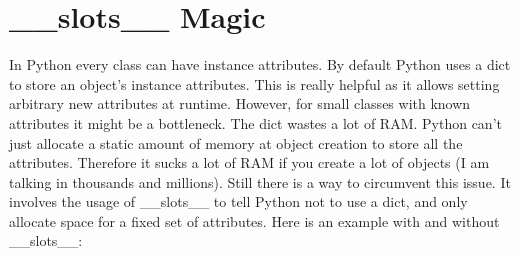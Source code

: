 \documentclass{report}
\begin{document}
    \pagebreak \bigbreak \noindent \section{\_\_slots\_\_ Magic}
    \bigbreak \noindent
    In Python every class can have instance attributes. By default Python uses a dict to store an object’s instance attributes. This is really helpful as it allows setting arbitrary new attributes at runtime.
    \bigbreak \noindent 
    However, for small classes with known attributes it might be a bottleneck. The dict wastes a lot of RAM. Python can’t just allocate a static amount of memory at object creation to store all the attributes. Therefore it sucks a lot of RAM if you create a lot of objects (I am talking in thousands and millions). Still there is a way to circumvent this issue. It involves the usage of \_\_slots\_\_ to tell Python not to use a dict, and only allocate space for a fixed set of attributes. Here is an example with and without \_\_slots\_\_:
\end{document}
